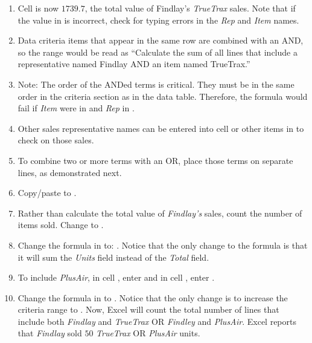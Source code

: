 \begin{enumbox}
\begin{enumerate}
		\item Cell  is now $ 1739.7 $, the total value of Findlay's \textit{TrueTrax} sales. Note that if the value in  is incorrect, check for typing errors in the \textit{Rep} and \textit{Item} names.
		\item Data criteria items that appear in the same row are combined with an AND, so the range  would be read as ``Calculate the sum of all lines that include a representative named Findlay AND an item named TrueTrax.''
		\item Note: The order of the ANDed terms is critical. They must be in the same order in the criteria section as in the data table. Therefore, the formula would fail if \textit{Item} were in  and \textit{Rep} in .
		\item Other sales representative names can be entered into cell  or other items in  to check on those sales.
		\item To combine two or more terms with an OR, place those terms on separate lines, as demonstrated next.
		\item Copy/paste  to .
		\item Rather than calculate the total value of \textit{Findlay's} sales, count the number of items sold. Change  to .
		\item Change the formula in  to: . Notice that the only change to the formula is that it will sum the \textit{Units} field instead of the \textit{Total} field.
		\item To include \textit{PlusAir}, in cell , enter  and in cell , enter .
		\item Change the formula in  to . Notice that the only change is to increase the criteria range to . Now, Excel will count the total number of lines that include both \textit{Findlay} and \textit{TrueTrax} OR \textit{Findley} and \textit{PlusAir}. Excel reports that \textit{Findlay} sold $ 50 $ \textit{TrueTrax} OR \textit{PlusAir} units.
		
	\end{enumerate}
\end{enumbox}

